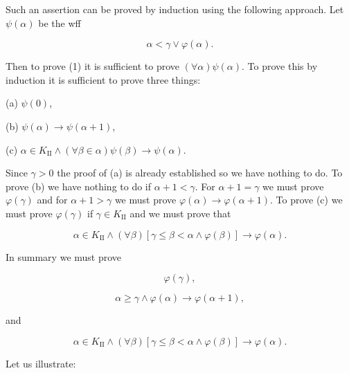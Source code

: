 Such an assertion can be proved by induction using the following approach. Let $\psi(\alpha)$ be the wff

$$\alpha < \gamma \lor \varphi(\alpha).$$

Then to prove (1) it is sufficient to prove $(\forall \alpha)\psi(\alpha)$. To prove this by induction it is sufficient to prove three things:

(a) $\psi(0)$,

(b) $\psi(\alpha) \rightarrow \psi(\alpha + 1)$,

(c) $\alpha \in K_{\text{II}} \land (\forall \beta \in \alpha)\psi(\beta) \rightarrow \psi(\alpha).$

Since $\gamma > 0$ the proof of (a) is already established so we have nothing to do. To prove (b) we have nothing to do if $\alpha + 1 < \gamma$. For $\alpha + 1 = \gamma$ we must prove $\varphi(\gamma)$ and for $\alpha + 1 > \gamma$ we must prove $\varphi(\alpha) \rightarrow \varphi(\alpha + 1)$. To prove (c) we must prove $\varphi(\gamma)$ if $\gamma \in K_{\text{II}}$ and we must prove that

$$\alpha \in K_{\text{II}} \land (\forall \beta)[\gamma \leq \beta < \alpha \land \varphi(\beta)] \rightarrow \varphi(\alpha).$$

In summary we must prove

$$\varphi(\gamma),$$

$$\alpha \geq \gamma \land \varphi(\alpha) \rightarrow \varphi(\alpha + 1),$$

and

$$\alpha \in K_{\text{II}} \land (\forall \beta)[\gamma \leq \beta < \alpha \land \varphi(\beta)] \rightarrow \varphi(\alpha).$$

Let us illustrate:

